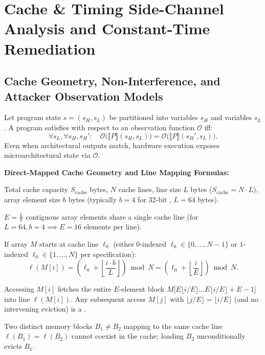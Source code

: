 \section{Cache \& Timing Side-Channel Analysis and Constant-Time Remediation}

\subsection{Cache Geometry, Non-Interference, and Attacker Observation Models}
Let program state $s = (s_H, s_L)$ be partitioned into  variables $s_H$ and  variables $s_L$. A program satisfies  with respect to an observation function $\mathcal{O}$ iff:
\[
  \forall s_L, \forall s_H, s_H' : \quad \mathcal{O}\big(\llbracket P \rrbracket(s_H, s_L)\big) = \mathcal{O}\big(\llbracket P \rrbracket(s_H', s_L)\big).
\]
Even when architectural outputs match, hardware execution exposes microarchitectural state via $\mathcal{O}$.

\textbf{Direct-Mapped Cache Geometry and Line Mapping Formulas:}
\begin{compactitem}
  \item {} Total cache capacity $S_{\text{cache}}$ bytes, $N$ cache lines, line size $L$ bytes ($S_{\text{cache}} = N \cdot L$), array element size $b$ bytes (typically $b=4$ for 32-bit , $L=64$ bytes).
  \item {} $E = \frac{L}{b}$ contiguous array elements share a single cache line (for $L=64, b=4 \implies E = 16$ elements per line).
  \item {} If array $M$ starts at cache line $\ell_0$ (either $0$-indexed $\ell_0 \in \{0,\dots,N-1\}$ or $1$-indexed $\ell_0 \in \{1,\dots,N\}$ per specification):
  \[
    \ell(M[i]) = \left(\ell_0 + \left\lfloor \frac{i \cdot b}{L} \right\rfloor\right) \bmod N = \left(\ell_0 + \left\lfloor \frac{i}{E} \right\rfloor\right) \bmod N.
  \]
  \item {} Accessing $M[i]$ fetches the entire $E$-element block $M\big[E\lfloor i/E\rfloor \dots E\lfloor i/E\rfloor + E - 1\big]$ into line $\ell(M[i])$. Any subsequent access $M[j]$ with $\lfloor j/E \rfloor = \lfloor i/E \rfloor$ (and no intervening eviction) is a .
  \item {} Two distinct memory blocks $B_1 \neq B_2$ mapping to the same cache line $\ell(B_1) = \ell(B_2)$ cannot coexist in the cache; loading $B_2$ unconditionally evicts $B_1$.
\end{compactitem}

